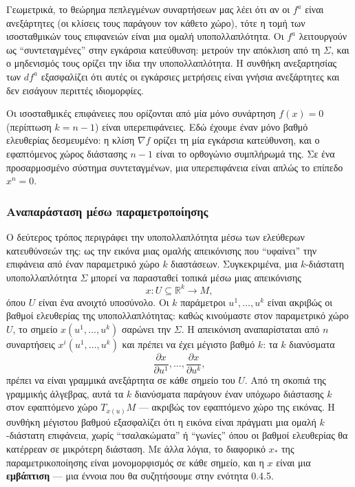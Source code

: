 \documentclass[11pt,a4paper,twoside,openright]{book}
\begin{document}
Γεωμετρικά, το θεώρημα πεπλεγμένων συναρτήσεων μας λέει ότι αν οι $f^a$ είναι ανεξάρτητες (οι κλίσεις τους παράγουν τον κάθετο χώρο), τότε η τομή των ισοσταθμικών τους επιφανειών είναι μια ομαλή υποπολλαπλότητα. Οι $f^a$ λειτουργούν ως ``συντεταγμένες'' στην εγκάρσια κατεύθυνση: μετρούν την απόκλιση από τη $\Sigma$, και ο μηδενισμός τους ορίζει την ίδια την υποπολλαπλότητα. Η συνθήκη ανεξαρτησίας των $df^a$ εξασφαλίζει ότι αυτές οι εγκάρσιες μετρήσεις είναι γνήσια ανεξάρτητες και δεν εισάγουν περιττές ιδιομορφίες.

Οι ισοσταθμικές επιφάνειες που ορίζονται από μία μόνο συνάρτηση $f(x) = 0$ (περίπτωση $k = n-1$) είναι υπερεπιφάνειες. Εδώ έχουμε έναν μόνο βαθμό ελευθερίας δεσμευμένο: η κλίση $\nabla f$ ορίζει τη μία εγκάρσια κατεύθυνση, και ο εφαπτόμενος χώρος διάστασης $n-1$ είναι το ορθογώνιο συμπλήρωμά της. Σε ένα προσαρμοσμένο σύστημα συντεταγμένων, μια υπερεπιφάνεια είναι απλώς το επίπεδο $x^n = 0$.

\subsubsection{Αναπαράσταση μέσω παραμετροποίησης}

Ο δεύτερος τρόπος περιγράφει την υποπολλαπλότητα μέσω των ελεύθερων κατευθύνσεών της: ως την εικόνα μιας ομαλής απεικόνισης που ``υφαίνει'' την επιφάνεια από έναν παραμετρικό χώρο $k$ διαστάσεων. Συγκεκριμένα, μια $k$-διάστατη υποπολλαπλότητα $\Sigma$ μπορεί να παρασταθεί τοπικά μέσω μιας απεικόνισης
\[
x: U \subseteq \mathbb{R}^k \to M,
\]
όπου $U$ είναι ένα ανοιχτό υποσύνολο. Οι $k$ παράμετροι $u^1, \dots, u^k$ είναι ακριβώς οι βαθμοί ελευθερίας της υποπολλαπλότητας: καθώς κινούμαστε στον παραμετρικό χώρο $U$, το σημείο $x(u^1, \dots, u^k)$ σαρώνει την $\Sigma$. Η απεικόνιση αναπαρίσταται από $n$ συναρτήσεις $x^i(u^1, \dots, u^k)$ και πρέπει να έχει μέγιστο βαθμό $k$: τα $k$ διανύσματα
\[
\frac{\partial x}{\partial u^1}, \dots, \frac{\partial x}{\partial u^k},
\]
πρέπει να είναι γραμμικά ανεξάρτητα σε κάθε σημείο του $U$. Από τη σκοπιά της γραμμικής άλγεβρας, αυτά τα $k$ διανύσματα παράγουν έναν υπόχωρο διάστασης $k$ στον εφαπτόμενο χώρο $T_{x(u)}M$ --- ακριβώς τον εφαπτόμενο χώρο της εικόνας. Η συνθήκη μέγιστου βαθμού εξασφαλίζει ότι η εικόνα είναι πράγματι μια ομαλή $k$-διάστατη επιφάνεια, χωρίς ``τσαλακώματα'' ή ``γωνίες'' όπου οι βαθμοί ελευθερίας θα κατέρρεαν σε μικρότερη διάσταση. Με άλλα λόγια, το διαφορικό $x_*$ της παραμετρικοποίησης είναι μονομορφισμός σε κάθε σημείο, και η $x$ είναι μια \textbf{εμβάπτιση} --- μια έννοια που θα συζητήσουμε στην ενότητα 0.4.5.
\end{document}
